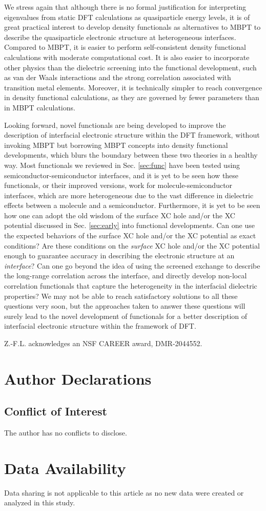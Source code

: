 \documentclass[aip, amsmath, amssymb, reprint, longbibliography]{revtex4-2}
\begin{document}
We stress again that although there is no formal justification for interpreting eigenvalues from static DFT calculations as quasiparticle energy levels, it is of great practical interest to develop density functionals as alternatives to MBPT to describe the quasiparticle electronic structure at heterogeneous interfaces. Compared to MBPT, it is easier to perform self-consistent density functional calculations with moderate computational cost. It is also easier to incorporate other physics than the dielectric screening into the functional development, such as van der Waals interactions and the strong correlation associated with transition metal elements. Moreover, it is technically simpler to reach convergence in density functional calculations, as they are governed by fewer parameters than in MBPT calculations.

Looking forward, novel functionals are being developed to improve the description of interfacial electronic structure within the DFT framework, without invoking MBPT but borrowing MBPT concepts into density functional developments, which blurs the boundary between these two theories in a healthy way. Most functionals we reviewed in Sec. \ref{sec:func} have been tested using semiconductor-semiconductor interfaces, and it is yet to be seen how these functionals, or their improved versions, work for molecule-semiconductor interfaces, which are more heterogeneous due to the vast difference in dielectric effects between a molecule and a semiconductor. Furthermore, it is yet to be seen how one can adopt the old wisdom of the surface XC hole and/or the XC potential discussed in Sec. \ref{sec:early} into functional developments. Can one use the expected behaviors of the surface XC hole and/or the XC potential as exact conditions? Are these conditions on the \emph{surface} XC hole and/or the XC potential enough to guarantee accuracy in describing the electronic structure at an \emph{interface}? Can one go beyond the idea of using the screened exchange to describe the long-range correlation across the interface, and directly develop non-local correlation functionals that capture the heterogeneity in the interfacial dielectric properties? We may not be able to reach satisfactory solutions to all these questions very soon, but the approaches taken to answer these questions will surely lead to the novel development of functionals for a better description of interfacial electronic structure within the framework of DFT.


\begin{acknowledgements}
Z.-F.L. acknowledges an NSF CAREER award, DMR-2044552.
\end{acknowledgements}

\section*{Author Declarations}
\subsection*{Conflict of Interest}
The author has no conflicts to disclose.

\section*{Data Availability}
Data sharing is not applicable to this article as no new data were created or analyzed in this study.

\end{document}
